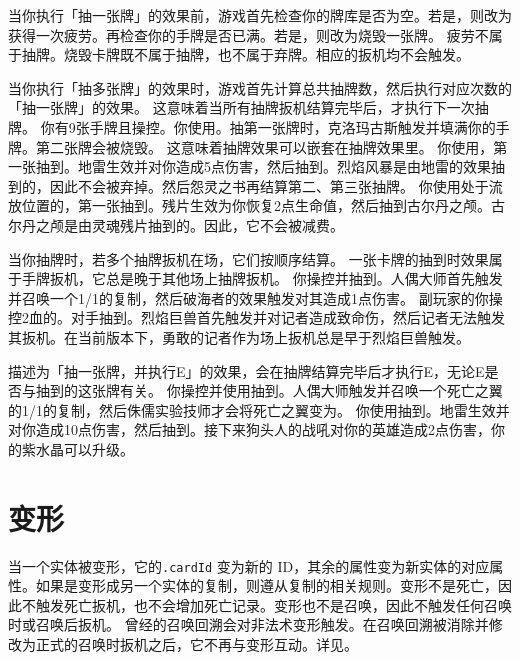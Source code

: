 当你执行「抽一张牌」的效果前，游戏首先检查你的牌库是否为空。若是，则改为获得一次疲劳。再检查你的手牌是否已满。若是，则改为烧毁一张牌。
\notice 疲劳不属于抽牌。烧毁卡牌既不属于抽牌，也不属于弃牌。相应的扳机均不会触发。

当你执行「抽多张牌」的效果时，游戏首先计算总共抽牌数，然后执行对应次数的「抽一张牌」的效果。
\notice 这意味着当所有抽牌扳机结算完毕后，才执行下一次抽牌。
\example 你有9张手牌且操控。你使用。抽第一张牌时，克洛玛古斯触发并填满你的手牌。第二张牌会被烧毁。
\notice 这意味着抽牌效果可以嵌套在抽牌效果里。
\example 你使用，第一张抽到。地雷生效并对你造成5点伤害，然后抽到。烈焰风暴是由地雷的效果抽到的，因此不会被弃掉。然后怨灵之书再结算第二、第三张抽牌。
\example 你使用处于流放位置的，第一张抽到。残片生效为你恢复2点生命值，然后抽到古尔丹之颅。古尔丹之颅是由灵魂残片抽到的。因此，它不会被减费。

当你抽牌时，若多个抽牌扳机在场，它们按顺序结算。
\notice 一张卡牌的抽到时效果属于手牌扳机，它总是晚于其他场上抽牌扳机。
\example 你操控并抽到。人偶大师首先触发并召唤一个1/1的复制，然后破海者的效果触发对其造成1点伤害。
\example {}副玩家的你操控2血的。对手抽到。烈焰巨兽首先触发并对记者造成致命伤，然后记者无法触发其扳机。在当前版本下，勇敢的记者作为场上扳机总是早于烈焰巨兽触发。

描述为「抽一张牌，并执行E」的效果，会在抽牌结算完毕后才执行E，无论E是否与抽到的这张牌有关。
\example 你操控并使用抽到。人偶大师触发并召唤一个死亡之翼的1/1的复制，然后侏儒实验技师才会将死亡之翼变为。
\example 你使用抽到。地雷生效并对你造成10点伤害，然后抽到。接下来狗头人的战吼对你的英雄造成2点伤害，你的紫水晶可以升级。

\section{变形}

当一个实体被变形，它的\texttt{.cardId} 变为新的 ID，其余的属性变为新实体的对应属性。如果是变形成另一个实体的复制，则遵从复制的相关规则。变形不是死亡，因此不触发死亡扳机，也不会增加死亡记录。变形也不是召唤，因此不触发任何召唤时或召唤后扳机。
\notice {}曾经的召唤回溯会对非法术变形触发。在召唤回溯被消除并修改为正式的召唤时扳机之后，它不再与变形互动。详见。

